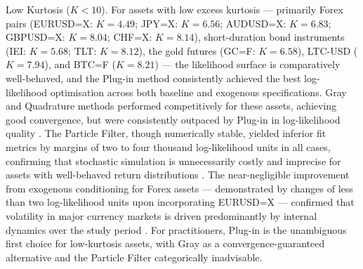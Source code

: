 \documentclass[12pt, a4paper]{article}
\begin{document}
Low Kurtosis ($K < 10$).
For assets with low excess kurtosis — primarily Forex pairs (EURUSD=X: $K = 4.49$; JPY=X: $K = 6.56$; AUDUSD=X: $K = 6.83$; GBPUSD=X: $K = 8.04$; CHF=X: $K = 8.14$), short-duration bond instruments (IEI: $K = 5.68$; TLT: $K = 8.12$), the gold futures (GC=F: $K = 6.58$), LTC-USD ($K = 7.94$), and BTC=F ($K = 8.21$) — the likelihood surface is comparatively well-behaved, and the Plug-in method consistently achieved the best log-likelihood optimisation across both baseline and exogenous specifications. Gray and Quadrature methods performed competitively for these assets, achieving good convergence, but were consistently outpaced by Plug-in in log-likelihood quality \citep{Gray1996, Klaassen2002}. The Particle Filter, though numerically stable, yielded inferior fit metrics by margins of two to four thousand log-likelihood units in all cases, confirming that stochastic simulation is unnecessarily costly and imprecise for assets with well-behaved return distributions \citep{Ardia2019}. The near-negligible improvement from exogenous conditioning for Forex assets — demonstrated by changes of less than two log-likelihood units upon incorporating EURUSD=X — confirmed that volatility in major currency markets is driven predominantly by internal dynamics over the study period \citep{Bollen2000}. For practitioners, Plug-in is the unambiguous first choice for low-kurtosis assets, with Gray as a convergence-guaranteed alternative and the Particle Filter categorically inadvisable.
\end{document}

